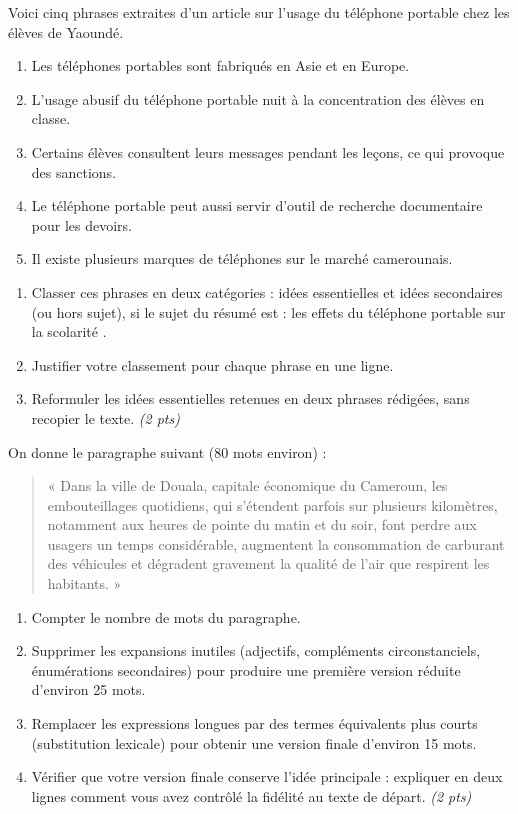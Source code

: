 \documentclass[11pt]{article}
\begin{document}
\begin{exercice}
Voici cinq phrases extraites d'un article sur l'usage du téléphone portable chez les élèves de Yaoundé.

\begin{enumerate}
\item[a)] Les téléphones portables sont fabriqués en Asie et en Europe.
\item[b)] L'usage abusif du téléphone portable nuit à la concentration des élèves en classe.
\item[c)] Certains élèves consultent leurs messages pendant les leçons, ce qui provoque des sanctions.
\item[d)] Le téléphone portable peut aussi servir d'outil de recherche documentaire pour les devoirs.
\item[e)] Il existe plusieurs marques de téléphones sur le marché camerounais.
\end{enumerate}

\begin{enumerate}
\item Classer ces phrases en deux catégories : idées essentielles et idées secondaires (ou hors sujet), si le sujet du résumé est : \og les effets du téléphone portable sur la scolarité \fg.
\item Justifier votre classement pour chaque phrase en une ligne.
\item Reformuler les idées essentielles retenues en deux phrases rédigées, sans recopier le texte. \textit{(2 pts)}
\end{enumerate}
\end{exercice}

\begin{exercice}
On donne le paragraphe suivant (80 mots environ) :

\begin{quote}
« Dans la ville de Douala, capitale économique du Cameroun, les embouteillages quotidiens, qui s'étendent parfois sur plusieurs kilomètres, notamment aux heures de pointe du matin et du soir, font perdre aux usagers un temps considérable, augmentent la consommation de carburant des véhicules et dégradent gravement la qualité de l'air que respirent les habitants. »
\end{quote}

\begin{enumerate}
\item Compter le nombre de mots du paragraphe.
\item Supprimer les expansions inutiles (adjectifs, compléments circonstanciels, énumérations secondaires) pour produire une première version réduite d'environ 25 mots.
\item Remplacer les expressions longues par des termes équivalents plus courts (substitution lexicale) pour obtenir une version finale d'environ 15 mots.
\item Vérifier que votre version finale conserve l'idée principale : expliquer en deux lignes comment vous avez contrôlé la fidélité au texte de départ. \textit{(2 pts)}
\end{enumerate}
\end{exercice}
\end{document}
